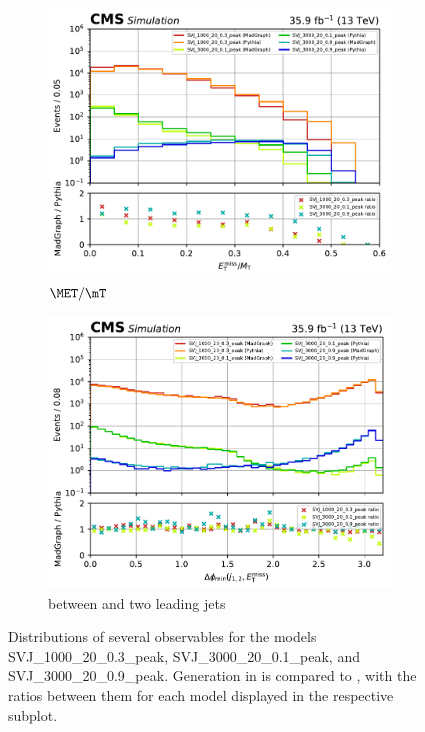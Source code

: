 \begin{figure}[htbp]
    \begin{subfigure}[b]{0.45\textwidth}
        \includegraphics[width=\textwidth]{figures/madgraph_pythia_comparisons/with_ratios/part1/met_over_mt.pdf}
        \caption{$\MET/\mT$}
    \end{subfigure}
    \hfill
    \begin{subfigure}[b]{0.45\textwidth}
        \includegraphics[width=\textwidth]{figures/madgraph_pythia_comparisons/with_ratios/part1/min_dphi.pdf}
        \caption{\mindphi between \MET and two leading \glspl{jet}}
    \end{subfigure}
    \caption[Distributions of several observables for the models SVJ\_1000\_20\_0.3\_peak, SVJ\_3000\_20\_0.1\_peak, and SVJ\_3000\_20\_0.9\_peak]{Distributions of several observables for the models SVJ\_1000\_20\_0.3\_peak, SVJ\_3000\_20\_0.1\_peak, and SVJ\_3000\_20\_0.9\_peak. Generation in \MGvATNLO is compared to \PYTHIAEIGHT, with the ratios between them for each model displayed in the respective subplot.}
    \label{fig:svj_mg_pythia_comparison_set1}
\end{figure}

